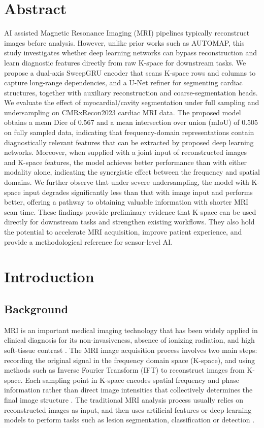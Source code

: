\documentclass[12pt,a4paper]{article}
\begin{document}
\section*{Abstract}
AI assisted Magnetic Resonance Imaging (MRI) pipelines typically reconstruct images before analysis. However, unlike prior works such as AUTOMAP, this study investigates whether deep learning networks can bypass reconstruction and learn diagnostic features directly from raw K-space for downstream tasks. We propose a dual-axis SweepGRU encoder that scans K-space rows and columns to capture long-range dependencies, and a U-Net refiner for segmenting cardiac structures, together with auxiliary reconstruction and coarse-segmentation heads. We evaluate the effect of myocardial/cavity segmentation under full sampling and undersampling on CMRxRecon2023 cardiac MRI data. The proposed model obtains a mean Dice of 0.567 and a mean intersection over union (mIoU) of 0.505 on fully sampled data, indicating that frequency-domain representations contain diagnostically relevant features that can be extracted by proposed deep learning networks. Moreover, when supplied with a joint input of reconstructed images and K-space features, the model achieves better performance than with either modality alone, indicating the synergistic effect between the frequency and spatial domains. We further observe that under severe undersampling, the model with K-space input degrades significantly less than that with image input and performs better, offering a pathway to obtaining valuable information with shorter MRI scan time. These findings provide preliminary evidence that K-space can be used directly for downstream tasks and strengthen existing workflows. They also hold the potential to accelerate MRI acquisition, improve patient experience, and provide a methodological reference for sensor-level AI.

\newpage
\section{Introduction}

\subsection{Background}
MRI is an important medical imaging technology that has been widely applied in clinical diagnosis for its non-invasiveness, absence of ionizing radiation, and high soft-tissue contrast \cite{1}. The MRI image acquisition process involves two main steps: recording the original signal in the frequency domain space (K-space), and using methods such as Inverse Fourier Transform (IFT) to reconstruct images from K-space. Each sampling point in K-space encodes spatial frequency and phase information rather than direct image intensities that collectively determines the final image structure \cite{2}\cite{5}. The traditional MRI analysis process usually relies on reconstructed images as input, and then uses artificial features or deep learning models to perform tasks such as lesion segmentation, classification or detection \cite{3}.
\end{document}
